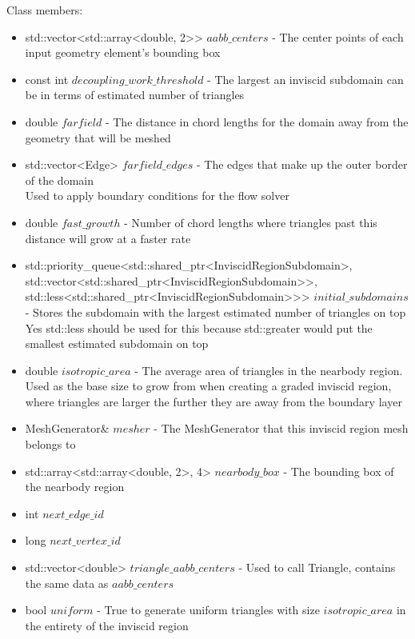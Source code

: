 \documentclass[manuscript, screen]{acmart}
\begin{document}
Class members:
\begin{itemize}
\item std::vector<std::array<double, 2>> $aabb\_centers$ - The center points of each input geometry element's bounding box

\item const int $decoupling\_work\_threshold$ - The largest an inviscid subdomain can be in terms of estimated number of triangles

\item double $farfield$ - The distance in chord lengths for the domain away from the geometry that will be meshed

\item std::vector<Edge> $farfield\_edges$ - The edges that make up the outer border of the domain\\
Used to apply boundary conditions for the flow solver

\item double $fast\_growth$ - Number of chord lengths where triangles past this distance will grow at a faster rate
    
\item std::priority\_queue<std::shared\_ptr<InviscidRegionSubdomain>, std::vector<std::shared\_ptr<InviscidRegionSubdomain>>, std::less<std::shared\_ptr<InviscidRegionSubdomain>>> $initial\_subdomains$ - Stores the subdomain with the largest estimated number of triangles on top\\
Yes std::less should be used for this because std::greater would put the smallest estimated subdomain on top

\item double $isotropic\_area$ - The average area of triangles in the nearbody region.\\
Used as the base size to grow from when creating a graded inviscid region, where triangles are larger the further they are away from the boundary layer

\item MeshGenerator\& $mesher$ - The MeshGenerator that this inviscid region mesh belongs to

\item std::array<std::array<double, 2>, 4> $nearbody\_box$ - The bounding box of the nearbody region

\item int $next\_edge\_id$

\item long $next\_vertex\_id$

\item std::vector<double> $triangle\_aabb\_centers$ - Used to call Triangle, contains the same data as $aabb\_centers$

\item bool $uniform$ - True to generate uniform triangles with size $isotropic\_area$ in the entirety of the inviscid region
\end{itemize}
\end{document}
